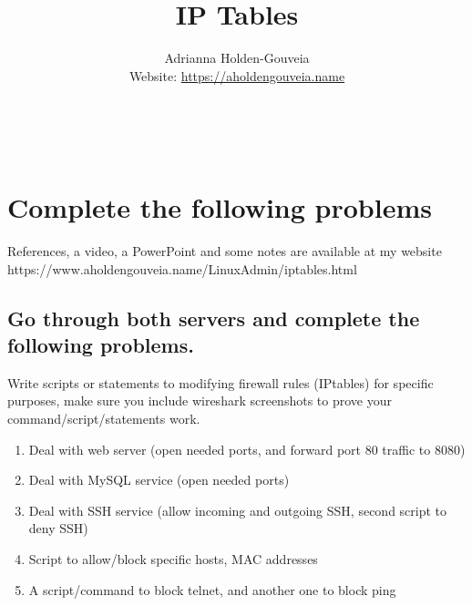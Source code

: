 \documentclass[12pt]{article}
\title{IP Tables}
\author{
        Adrianna Holden-Gouveia \\
        Website: \url{https://aholdengouveia.name}\\ 
        \date{\vspace{-5ex}}
        \faLinkedin{: aholdengouveia} \\
        \faGithub {: aholdengouveia} \\
        }
\begin{document}
    

\maketitle


\section*{Complete the following problems}

References, a video, a PowerPoint and some notes are available at my website
https://www.aholdengouveia.name/LinuxAdmin/iptables.html

\subsection*{Go through both servers and complete the following problems.  }

Write scripts or statements to modifying firewall rules (IPtables) for specific purposes, make sure you include wireshark screenshots to prove your command/script/statements work. 
    \begin{enumerate}
        \item Deal with web server (open needed ports, and forward port 80 traffic to 8080) 
        \item Deal with MySQL service (open needed ports)
        \item Deal with SSH service (allow incoming and outgoing SSH, second script to deny SSH)
        \item Script to allow/block specific hosts, MAC addresses
        \item A script/command to block telnet, and another one to block ping
    \end{enumerate} 
\end{document}

